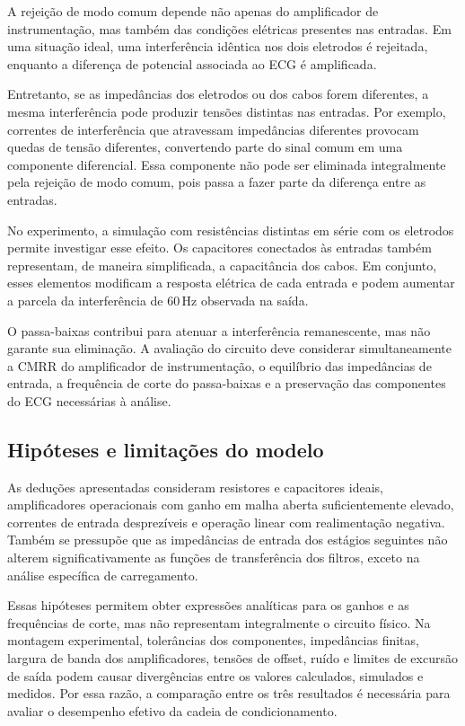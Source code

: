 \documentclass[11pt,a4paper]{article}
\begin{document}
A rejeição de modo comum depende não apenas do amplificador de instrumentação, mas também das condições elétricas presentes nas entradas. Em uma situação ideal, uma interferência idêntica nos dois eletrodos é rejeitada, enquanto a diferença de potencial associada ao ECG é amplificada.

Entretanto, se as impedâncias dos eletrodos ou dos cabos forem diferentes, a mesma interferência pode produzir tensões distintas nas entradas. Por exemplo, correntes de interferência que atravessam impedâncias diferentes provocam quedas de tensão diferentes, convertendo parte do sinal comum em uma componente diferencial. Essa componente não pode ser eliminada integralmente pela rejeição de modo comum, pois passa a fazer parte da diferença entre as entradas.

No experimento, a simulação com resistências distintas em série com os eletrodos permite investigar esse efeito. Os capacitores conectados às entradas também representam, de maneira simplificada, a capacitância dos cabos. Em conjunto, esses elementos modificam a resposta elétrica de cada entrada e podem aumentar a parcela da interferência de $60\,\mathrm{Hz}$ observada na saída.

O passa-baixas contribui para atenuar a interferência remanescente, mas não garante sua eliminação. A avaliação do circuito deve considerar simultaneamente a CMRR do amplificador de instrumentação, o equilíbrio das impedâncias de entrada, a frequência de corte do passa-baixas e a preservação das componentes do ECG necessárias à análise.

\subsection{Hipóteses e limitações do modelo}

As deduções apresentadas consideram resistores e capacitores ideais, amplificadores operacionais com ganho em malha aberta suficientemente elevado, correntes de entrada desprezíveis e operação linear com realimentação negativa. Também se pressupõe que as impedâncias de entrada dos estágios seguintes não alterem significativamente as funções de transferência dos filtros, exceto na análise específica de carregamento.

Essas hipóteses permitem obter expressões analíticas para os ganhos e as frequências de corte, mas não representam integralmente o circuito físico. Na montagem experimental, tolerâncias dos componentes, impedâncias finitas, largura de banda dos amplificadores, tensões de offset, ruído e limites de excursão de saída podem causar divergências entre os valores calculados, simulados e medidos. Por essa razão, a comparação entre os três resultados é necessária para avaliar o desempenho efetivo da cadeia de condicionamento.
\end{document}
